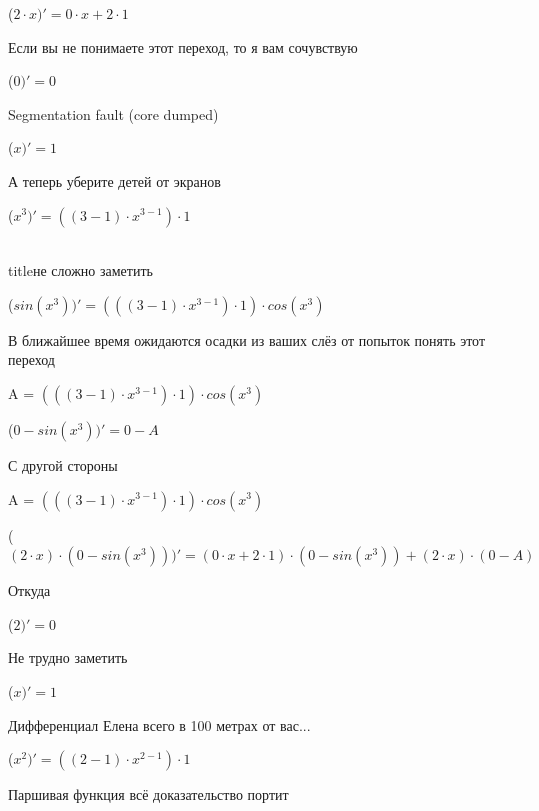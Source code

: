 \documentclass[12pt,a4paper,fleqn]{article}
\begin{document}
\begin{center}
 ($2 \cdot x)'
  = 0 \cdot x+2 \cdot 1$\end{center}
Если вы не понимаете этот переход, то я вам сочувствую

\begin{center}
 ($0)'
  = 0$\end{center}
Segmentation fault (core dumped)

\begin{center}
 ($x)'
  = 1$\end{center}
А теперь уберите детей от экранов

\begin{center}
 ($x^{3})'
  = ((3-1) \cdot x^{3-1}) \cdot 1$\end{center}
\\ title{не сложно заметить} 

\begin{center}
 ($sin(x^{3}))'
  = (((3-1) \cdot x^{3-1}) \cdot 1) \cdot cos(x^{3})$\end{center}
В ближайшее время ожидаются осадки из ваших слёз от попыток понять этот переход

\begin{center}
A = $(((3-1) \cdot x^{3-1}) \cdot 1) \cdot cos(x^{3})$\end{center}
\begin{center}
 ($0-sin(x^{3}))'
  = 0-A$\end{center}
С другой стороны

\begin{center}
A = $(((3-1) \cdot x^{3-1}) \cdot 1) \cdot cos(x^{3})$\end{center}
\begin{center}
 ($(2 \cdot x) \cdot (0-sin(x^{3})))'
  = (0 \cdot x+2 \cdot 1) \cdot (0-sin(x^{3}))+(2 \cdot x) \cdot (0-A)$\end{center}
Откуда

\begin{center}
 ($2)'
  = 0$\end{center}
Не трудно заметить

\begin{center}
 ($x)'
  = 1$\end{center}
Дифференциал Елена всего в 100 метрах от вас...

\begin{center}
 ($x^{2})'
  = ((2-1) \cdot x^{2-1}) \cdot 1$\end{center}
Паршивая функция всё доказательство портит\cite{link2}
\end{document}
